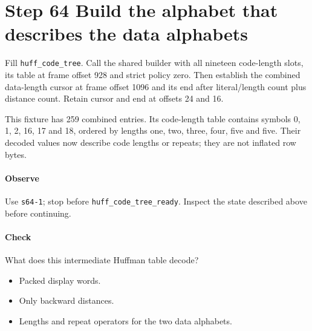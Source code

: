 \section{Step 64 Build the alphabet that describes the data alphabets}\label{png-huff-s64}
Fill \texttt{huff\_code\_tree}. Call the shared builder with all nineteen code-length slots, its table at frame offset 928 and strict policy zero. Then establish the combined data-length cursor at frame offset 1096 and its end after literal/length count plus distance count. Retain cursor and end at offsets 24 and 16.

This fixture has 259 combined entries. Its code-length table contains symbols 0, 1, 2, 16, 17 and 18, ordered by lengths one, two, three, four, five and five. Their decoded values now describe code lengths or repeats; they are not inflated row bytes.

\paragraph{Observe} Use \texttt{s64-1}; stop before \texttt{huff\_code\_tree\_ready}. Inspect the state described above before continuing.

\paragraph{Check} What does this intermediate Huffman table decode?
\begin{itemize}
  \item[A.] Packed display words.
  \item[B.] Only backward distances.
  \item[C.] Lengths and repeat operators for the two data alphabets.
\end{itemize}
